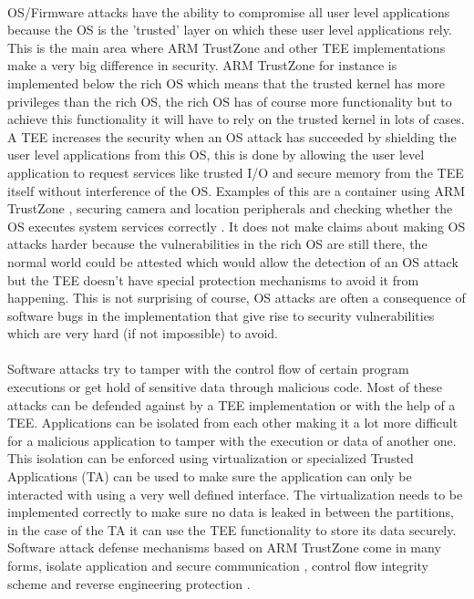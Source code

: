 \documentclass{report}
\begin{document}
\paragraph*{}
OS/Firmware attacks have the ability to compromise all user level applications because the OS is the 'trusted' layer on which these user level applications rely. This is the main area where ARM TrustZone and other TEE implementations make a very big difference in security. ARM TrustZone for instance is implemented below the rich OS which means that the trusted kernel has more privileges than the rich OS, the rich OS has of course more functionality but to achieve this functionality it will have to rely on the trusted kernel in lots of cases. A TEE increases the security when an OS attack has succeeded by shielding the user level applications from this OS, this is done by allowing the user level application to request services like trusted I/O and secure memory from the TEE itself without interference of the OS. Examples of this are a container using ARM TrustZone \cite{HuaZhichao2021Tpcf}, securing camera and location peripherals \cite{SalmanAmmarS2021SMSG} and checking whether the OS executes system services correctly \cite{GuanLe2017TSEo}. It does not make claims about making OS attacks harder because the vulnerabilities in the rich OS are still there, the normal world could be attested which would allow the detection of an OS attack but the TEE doesn't have special protection mechanisms to avoid it from happening. This is not surprising of course, OS attacks are often a consequence of software bugs in the implementation that give rise to security vulnerabilities which are very hard (if not impossible) to avoid.

\paragraph*{}
Software attacks try to tamper with the control flow of certain program executions or get hold of sensitive data through malicious code. Most of these attacks can be defended against by a TEE implementation or with the help of a TEE. Applications can be isolated from each other making it a lot more difficult for a malicious application to tamper with the execution or data of another one. This isolation can be enforced using virtualization or specialized Trusted Applications (TA) can be used to make sure the application can only be interacted with using a very well defined interface. The virtualization needs to be implemented correctly to make sure no data is leaked in between the partitions, in the case of the TA it can use the TEE functionality to store its data securely. Software attack defense mechanisms based on ARM TrustZone come in many forms, isolate application and secure communication \cite{ZhangDiming2020iIfs}, control flow integrity scheme \cite{KawadaTomoaki2020TRCI} and reverse engineering protection \cite{BenYehudaRaz2019Pare}.
\end{document}
